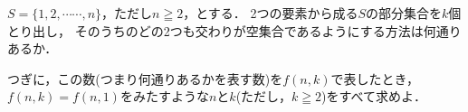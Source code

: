 \documentclass[../../main.tex]{subfiles}
\begin{document}
$S=\{1,2,\cdots\cdots,n\}$，ただし$n\geqq2$，とする．
2つの要素から成る$S$の部分集合を$k$個とり出し，
そのうちのどの2つも交わりが空集合であるようにする方法は何通りあるか．

つぎに，この数(つまり何通りあるかを表す数)を$f(n,k)$で表したとき，
$f(n,k)=f(n,1)$をみたすような$n$と$k$(ただし，$k\geqq2$)をすべて求めよ．
\end{document}
